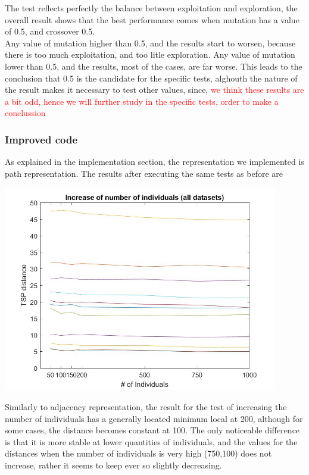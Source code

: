 The test reflects perfectly the balance between exploitation and
exploration, the overall result shows that the best performance comes when
mutation has a value of 0.5, and crossover 0.5.\\
Any value of mutation higher than 0.5, and the results start to worsen, because
there is too much exploitation, and too litle exploration. Any value of mutation
lower than 0.5, and the results, most of the cases, are far worse. This leads to
the conclusion that 0.5 is the candidate for the specific tests, alghouth
the nature of the result makes it necessary to test other values, since,
\textcolor{red}{we think these results are a bit odd, hence we will further
study in the specific tests, order to make a conclussion}


\subsubsection{Improved code}

As explained in the implementation section, the representation we
implemented is path representation. The results after executing the same
tests as before are

\begin{center}
\includegraphics[width=12cm]{img/order_crossover/numberIndiv.jpg}
\end{center}

Similarly to adjacency representation, the result for the test
of increasing the number of individuals has a generally located minimum local at
200, although for some cases, the distance becomes constant at 100. The only
noticeable difference is that it is more stable at lower quantities of
individuals, and the values for the distances when the number of
individuals is very high (750,100) does not increase, rather it seems to keep
ever so slightly decreasing.

